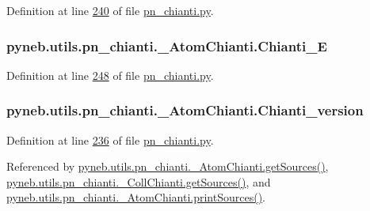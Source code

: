 Definition at line \hyperlink{pn__chianti_8py_source_l00240}{240} of file \hyperlink{pn__chianti_8py_source}{pn\+\_\+chianti.\+py}.

\hypertarget{classpyneb_1_1utils_1_1pn__chianti_1_1___atom_chianti_ad3eb8ed7f4cb58a7806dd820b22f3d37}{}
\subsubsection[{Chianti\+\_\+\+E}]{\setlength{\rightskip}{0pt plus 5cm}pyneb.\+utils.\+pn\+\_\+chianti.\+\_\+\+Atom\+Chianti.\+Chianti\+\_\+\+E}\label{classpyneb_1_1utils_1_1pn__chianti_1_1___atom_chianti_ad3eb8ed7f4cb58a7806dd820b22f3d37}


Definition at line \hyperlink{pn__chianti_8py_source_l00248}{248} of file \hyperlink{pn__chianti_8py_source}{pn\+\_\+chianti.\+py}.

\hypertarget{classpyneb_1_1utils_1_1pn__chianti_1_1___atom_chianti_a56253efc79815d86493f5753ff9c5b72}{}
\subsubsection[{Chianti\+\_\+version}]{\setlength{\rightskip}{0pt plus 5cm}pyneb.\+utils.\+pn\+\_\+chianti.\+\_\+\+Atom\+Chianti.\+Chianti\+\_\+version}\label{classpyneb_1_1utils_1_1pn__chianti_1_1___atom_chianti_a56253efc79815d86493f5753ff9c5b72}


Definition at line \hyperlink{pn__chianti_8py_source_l00236}{236} of file \hyperlink{pn__chianti_8py_source}{pn\+\_\+chianti.\+py}.



Referenced by \hyperlink{pn__chianti_8py_source_l00373}{pyneb.\+utils.\+pn\+\_\+chianti.\+\_\+\+Atom\+Chianti.\+get\+Sources()}, \hyperlink{pn__chianti_8py_source_l00540}{pyneb.\+utils.\+pn\+\_\+chianti.\+\_\+\+Coll\+Chianti.\+get\+Sources()}, and \hyperlink{pn__chianti_8py_source_l00384}{pyneb.\+utils.\+pn\+\_\+chianti.\+\_\+\+Atom\+Chianti.\+print\+Sources()}.

